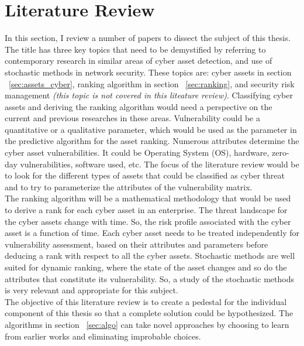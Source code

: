 \section{Literature Review}\label{sec:literature_review}
In this section, I review a number of papers to dissect the subject of this thesis. The title has three key topics that need to be demystified by referring to contemporary research in similar areas of cyber asset detection, and use of stochastic methods in network security. These topics are: cyber assets in section ~\ref{sec:assets_cyber}, ranking algorithm in section ~\ref{sec:ranking}, and security risk management \textit{(this topic is not covered in this liteature review)}.
Classifying cyber assets and deriving the ranking algorithm would need a perspective on the current and previous researches in these areas. Vulnerability could be a quantitative or a qualitative parameter, which would be used as the parameter in the predictive algorithm for the asset ranking. Numerous attributes determine the cyber asset vulnerabilities. It could be Operating System (OS), hardware, zero-day vulnerabilities, software used, etc. The focus of the literature review would be to look for the different types of assets that could be classified as cyber threat and to try to parameterize the attributes of the vulnerability matrix.\\
The ranking algorithm will be a mathematical methodology that would be used to derive a rank for each cyber asset in an enterprise. The threat landscape for the cyber assets change with time. So, the risk profile associated with the cyber asset is a function of time. Each cyber asset needs to be treated independently for vulnerability assessment, based on their attributes and parameters before deducing a rank with respect to all the cyber assets. Stochastic methods are well suited for dynamic ranking, where the state of the asset changes and so do the attributes that constitute its vulnerability. So, a study of the stochastic methods is very relevant and appropriate for this subject. \\
The objective of this literature review is to create a pedestal for the individual component of this thesis so that a complete solution could be hypothesized. The algorithms in section ~\ref{sec:algo} can take novel approaches by choosing to learn from earlier works and eliminating improbable choices. \\ 

